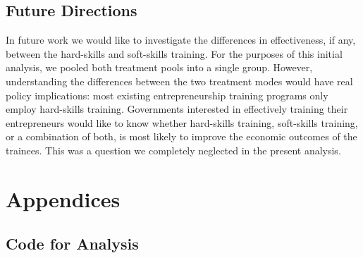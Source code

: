 \documentclass[oneside, notitlepage]{book}
\begin{document}
\section{Future Directions}
\label{sec:future-directions}

In future work we would like to investigate the differences in effectiveness, if any, between the hard-skills and soft-skills training. For the purposes of this initial analysis, we pooled both treatment pools into a single group. However, understanding the differences between the two treatment modes would have real policy implications: most existing entrepreneurship training programs only employ hard-skills training. Governments interested in effectively training their entrepreneurs would like to know whether hard-skills training, soft-skills training, or a combination of both, is most likely to improve the economic outcomes of the trainees. This was a question we completely neglected in the present analysis.

\printbibliography


\chapter{Appendices}
\label{cha:appendices}



\section{Code for Analysis}
\label{sec:appendix-1}











































\end{document}
